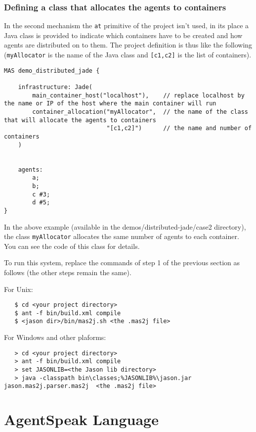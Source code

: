 \documentclass{article}
\newcommand{\jason}[0]{\htlink{\textit{Jason}}{http://jason.sf.net}\xspace}
\begin{document}
\begin{description}
\subsubsection{Defining a class that allocates the agents to containers}

In the second mechanism the \texttt{at} primitive of the project isn't
used, in its place a Java class is provided to indicate which
containers have to be created and how agents are distributed on to them.
The project definition is thus like the following
(\texttt{myAllocator} is the name of the Java class and
\texttt{[c1,c2]} is the list of containers).
\begin{verbatim}
MAS demo_distributed_jade {

    infrastructure: Jade(
        main_container_host("localhost"),    // replace localhost by the name or IP of the host where the main container will run
        container_allocation("myAllocator",  // the name of the class that will allocate the agents to containers
                             "[c1,c2]")      // the name and number of containers
    ) 
	

    agents:
        a; 
        b;   
        c #3; 
        d #5;
}
\end{verbatim}

In the above example (available in the demos/distributed-jade/case2
directory), the class \texttt{myAllocator} allocates the same number
of agents to each container. You can see the code of this class for
details.

To run this system, replace the commands of step 1 of the previous
section as follows (the other steps remain the same).

For Unix:
\begin{verbatim}
   $ cd <your project directory>
   $ ant -f bin/build.xml compile
   $ <jason dir>/bin/mas2j.sh <the .mas2j file>
\end{verbatim}

For Windows and other plaforms:
\begin{verbatim}
   > cd <your project directory>
   > ant -f bin/build.xml compile
   > set JASONLIB=<the Jason lib directory>
   > java -classpath bin\classes;%JASONLIB%\jason.jar jason.mas2j.parser.mas2j  <the .mas2j file>
\end{verbatim}



\section{AgentSpeak Language}


\end{description}
\end{document}
